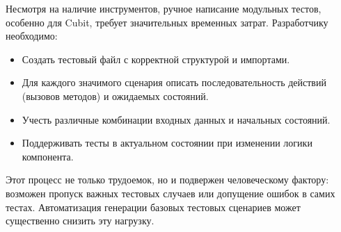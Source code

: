 \documentclass[14pt, russian]{scrartcl}
\begin{document}
Несмотря на наличие инструментов, ручное написание модульных тестов, особенно для Cubit, требует значительных временных затрат. Разработчику необходимо:
\begin{itemize}
    \item Создать тестовый файл с корректной структурой и импортами.
    \item Для каждого значимого сценария описать последовательность действий (вызовов методов) и ожидаемых состояний.
    \item Учесть различные комбинации входных данных и начальных состояний.
    \item Поддерживать тесты в актуальном состоянии при изменении логики компонента.
\end{itemize}
Этот процесс не только трудоемок, но и подвержен человеческому фактору: возможен пропуск важных тестовых случаев или допущение ошибок в самих тестах. Автоматизация генерации базовых тестовых сценариев может существенно снизить эту нагрузку.
\end{document}
